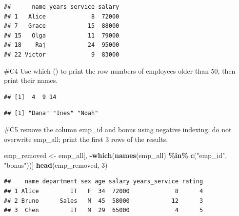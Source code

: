 \documentclass[
]{article}
\newenvironment{Shaded}{\begin{snugshade}}{\end{snugshade}}
\newcommand{\DecValTok}[1]{\textcolor[rgb]{0.00,0.00,0.81}{#1}}
\newcommand{\FunctionTok}[1]{\textcolor[rgb]{0.13,0.29,0.53}{\textbf{#1}}}
\newcommand{\NormalTok}[1]{#1}
\newcommand{\OtherTok}[1]{\textcolor[rgb]{0.56,0.35,0.01}{#1}}
\newcommand{\SpecialCharTok}[1]{\textcolor[rgb]{0.81,0.36,0.00}{\textbf{#1}}}
\newcommand{\StringTok}[1]{\textcolor[rgb]{0.31,0.60,0.02}{#1}}
\begin{document}
\begin{verbatim}
##      name years_service salary
## 1   Alice             8  72000
## 7   Grace            15  88000
## 15   Olga            11  79000
## 18    Raj            24  95000
## 22 Victor             9  83000
\end{verbatim}

\#C4 Use which () to print the row numbers of employees older than 50,
then print their names.

\begin{Shaded}
\end{Shaded}

\begin{verbatim}
## [1]  4  9 14
\end{verbatim}

\begin{Shaded}
\end{Shaded}

\begin{verbatim}
## [1] "Dana" "Ines" "Noah"
\end{verbatim}

\#C5 remove the column emp\_id and bonus using negative indexing. do not
overwrite emp\_all; print the first 3 rows of the results.

\begin{Shaded}
\begin{Highlighting}[]
\NormalTok{emp\_removed }\OtherTok{\textless{}{-}}\NormalTok{ emp\_all[, }\SpecialCharTok{{-}}\FunctionTok{which}\NormalTok{(}\FunctionTok{names}\NormalTok{(emp\_all) }\SpecialCharTok{\%in\%} \FunctionTok{c}\NormalTok{(}\StringTok{"emp\_id"}\NormalTok{, }\StringTok{"bonus"}\NormalTok{))]}
\FunctionTok{head}\NormalTok{(emp\_removed, }\DecValTok{3}\NormalTok{)}
\end{Highlighting}
\end{Shaded}

\begin{verbatim}
##    name department sex age salary years_service rating
## 1 Alice         IT   F  34  72000             8      4
## 2 Bruno      Sales   M  45  58000            12      3
## 3  Chen         IT   M  29  65000             4      5
\end{verbatim}
\end{document}
